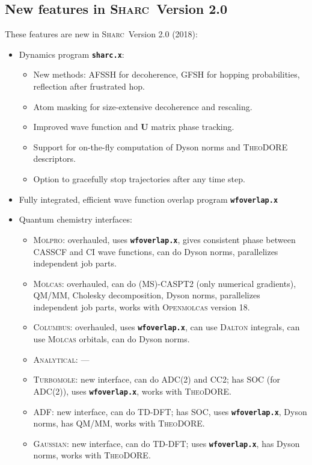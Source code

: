 \documentclass[a4paper,10pt,DIV=15,openany]{scrbook}
\newcommand{\sharc}{\textsc{Sharc}}
\newcommand{\ttt}[1]{\textbf{\texttt{#1}}}
\newcommand{\VEC}[1]{\ensuremath{\mathbf{#1}}}
\begin{document}
\subsection{New features in \sharc\ Version 2.0}

These features are new in \sharc\ Version 2.0 (2018):
\begin{itemize}
  \item Dynamics program \ttt{sharc.x}:
  \begin{itemize}
    \item New methods: AFSSH for decoherence, GFSH for hopping probabilities, reflection after frustrated hop.
    \item Atom masking for size-extensive decoherence and rescaling.
    \item Improved wave function and $\VEC{U}$ matrix phase tracking.
    \item Support for on-the-fly computation of Dyson norms and \textsc{TheoDORE} descriptors.
    \item Option to gracefully stop trajectories after any time step.
  \end{itemize}
  \item Fully integrated, efficient wave function overlap program \ttt{wfoverlap.x}
  \item Quantum chemistry interfaces:
  \begin{itemize}
    \item \textsc{Molpro}: overhauled, uses \ttt{wfoverlap.x}, gives consistent phase between CASSCF and CI wave functions, can do Dyson norms, parallelizes independent job parts.
    \item \textsc{Molcas}: overhauled, can do (MS)-CASPT2 (only numerical gradients), QM/MM, Cholesky decomposition, Dyson norms, parallelizes independent job parts, works with \textsc{Openmolcas} version 18.
    \item \textsc{Columbus}: overhauled, uses \ttt{wfoverlap.x}, can use \textsc{Dalton} integrals, can use \textsc{Molcas} orbitals, can do Dyson norms.
    \item \textsc{Analytical}: ---
    \item \textsc{Turbomole}: new interface, can do ADC(2) and CC2; has SOC (for ADC(2)), uses \ttt{wfoverlap.x}, works with \textsc{TheoDORE}.
    \item \textsc{ADF}: new interface, can do TD-DFT; has SOC, uses \ttt{wfoverlap.x}, Dyson norms, has QM/MM, works with \textsc{TheoDORE}.
    \item \textsc{Gaussian}: new interface, can do TD-DFT; uses \ttt{wfoverlap.x}, has Dyson norms, works with \textsc{TheoDORE}.

\end{itemize}
\end{itemize}
\end{document}
